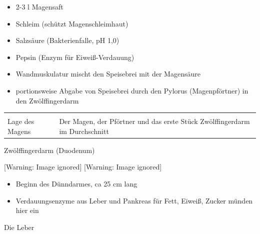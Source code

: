 \documentclass{article}
\begin{document}
\begin{itemize}
\item 2-3 l Magensaft

\item Schleim (sch\"utzt  Magenschleimhaut)

\item Salzs\"aure (Bakterienfalle, pH 1,0)

\item Pepsin  (Enzym f\"ur Eiwei{\ss}-Verdauung)

\item Wandmuskulatur mischt den Speisebrei mit der Magens\"aure

\item portionsweise Abgabe von Speisebrei durch den Pylorus
(Magenpf\"ortner) in den Zw\"olffingerdarm

\end{itemize}
\begin{center}
\tablehead{}\begin{supertabular}{|m{6.649cm}|m{6.651cm}|}
\hline
 &
\\\hline
{%
 \par}

 &
{%
 \par}

\\\hline
{\mdseries\upshape Lage des Magens}

 &
{\mdseries\upshape Der Magen, der Pf\"ortner und das erste St\"uck
Zw\"olffingerdarm im Durchschnitt}

\\\hline
\end{supertabular}
\end{center}
{\mdseries\color[rgb]{0.0,0.0,0.5019608}
Zw\"olffingerdarm (Duodenum)}

  [Warning: Image ignored] %
   [Warning: Image ignored] %
 

\begin{itemize}
\item {\mdseries
Beginn des D\"unndarmes, ca 25 cm lang}

\item {\mdseries
Verdauungsenzyme aus Leber und Pankreas f\"ur Fett, Eiwei{\ss}, Zucker
m\"unden hier ein}

\end{itemize}
{\mdseries\color[rgb]{0.0,0.0,0.5019608}
Die Leber }
\end{document}
